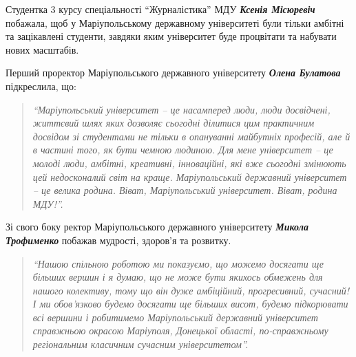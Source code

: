 Студентка 3 курсу спеціальності \enquote{Журналістика} МДУ \emph{\textbf{Ксенія Місюревіч}} побажала,
щоб у Маріупольському державному університеті були тільки амбітні та
зацікавлені студенти, завдяки яким університет буде процвітати та набувати
нових масштабів.


Перший проректор Маріупольського державного університету \emph{\textbf{Олена Булатова}}
підкреслила, що: 

\begin{quote}
\em\enquote{Маріупольський університет – це насамперед люди, люди
досвідчені, життєвий шлях яких дозволяє сьогодні ділитися цим практичним
досвідом зі студентами не тільки в опануванні майбутніх професій, але й в
частині того, як бути чемною людиною. Для мене університет – це молоді люди,
амбітні, креативні, інноваційні, які вже сьогодні змінюють цей недосконалий
світ на краще. Маріупольський державний університет – це велика родина. Віват,
Маріупольський університет. Віват, родина МДУ!}.
\end{quote}

Зі свого боку ректор Маріупольського державного університету \emph{\textbf{Микола Трофименко}}
побажав мудрості, здоров'я та розвитку. 

\begin{quote}
\em\enquote{Нашою спільною роботою ми показуємо,
що можемо досягати ще більших вершин і я думаю, що не може бути якихось
обмежень для нашого колективу, тому що він дуже амбіційний, прогресивний,
сучасний! І ми обов'язково будемо досягати ще більших висот, будемо підкорювати
всі вершини і робитимемо Маріупольський державний університет справжньою
окрасою Маріуполя, Донецької області, по-справжньому регіональним класичним
сучасним університетом}.
\end{quote}

